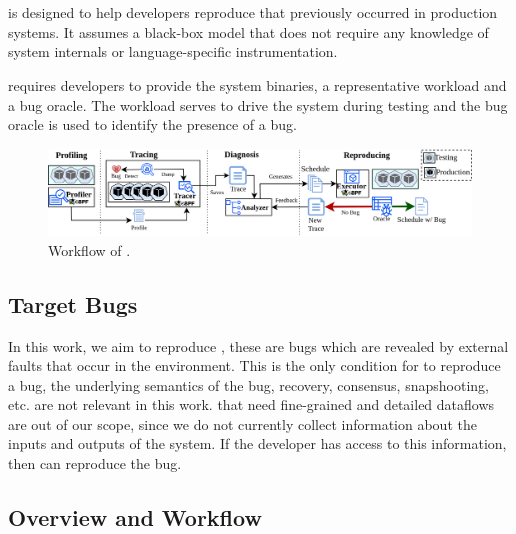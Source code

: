 \section{\sys}

\sys is designed to help developers reproduce \efibshort that previously occurred in production systems.
It assumes a black-box model that does not require any knowledge of system internals or language-specific instrumentation.

%
\sys requires developers to provide the system binaries, a representative workload and a bug oracle.
The workload serves to drive the system during testing and the bug oracle is used to identify the presence of a bug.



\begin{figure}[htbp]
	\centering
	\includegraphics[height=0.16\textheight]{Figures/ROSE-Paper Workflow.png}
	\caption{Workflow of \sys.}
	\label{fig:workflow}
\end{figure}

\subsection{Target Bugs}
\label{sec:targetbugs}
In this work, we aim to reproduce \efibshort, these are bugs which are revealed by external faults that occur in the environment.
This is the only condition for \sys to reproduce a bug, the underlying semantics of the bug, recovery, consensus, snapshooting, etc. are not relevant
in this work.
\efibshort that need fine-grained and detailed dataflows are out of our scope, since we do not currently collect information about the inputs and outputs of the system.
If the developer has access to this information, then \sys can reproduce the bug.


\subsection{Overview and Workflow}
\label{sec:overview}

